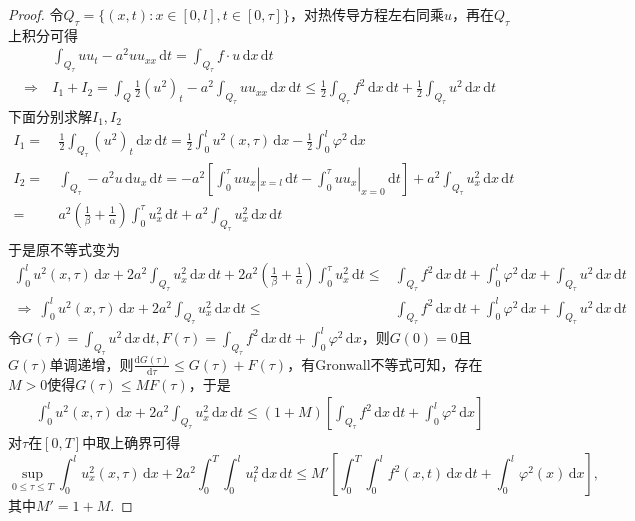 \documentclass[12pt, a4paper, oneside]{ctexart}
\let\leq=\leqslant %
\def\d{\mathrm{d}}          %
\begin{document}
\begin{proof}
    令$Q_\tau = \{(x,t):x\in[0,l],t\in [0,\tau]\}$，对热传导方程左右同乘$u$，再在$Q_\tau$上积分可得
    \begin{align*}
        &\ \int_{Q_\tau}uu_t-a^2uu_{xx}\,\d t = \int_{Q_\tau}f\cdot u\,\d x\,\d t\\
        \Rightarrow&\ I_1+I_2=\int_Q\frac{1}{2}(u^2)_t - a^2\int_{Q_\tau}uu_{xx}\,\d x\,\d t\leq \frac{1}{2}\int_{Q_\tau}f^2\,\d x\,\d t+\frac{1}{2}\int_{Q_\tau}u^2\,\d x\,\d t
    \end{align*}
    下面分别求解$I_1,I_2$
    \begin{align*}
        I_1=&\ \frac{1}{2}\int_{Q_\tau}(u^2)_t\,\d x\,\d t = \frac{1}{2}\int_0^lu^2(x,\tau)\,\d x-\frac{1}{2}\int_0^l\varphi^2\,\d x\\
        I_2=&\ \int_{Q_\tau}-a^2u\,\d u_x\,\d t = -a^2\left[\int_0^\tau uu_x|_{x=l}\,\d t - \int_0^\tau uu_x|_{x=0}\,\d t\right]+a^2\int_{Q_\tau}u_x^2\,\d x\,\d t\\
        =&\ a^2\left(\frac{1}{\beta}+\frac{1}{\alpha}\right)\int_0^\tau u_x^2\,\d t + a^2\int_{Q_\tau}u_x^2\,\d x\,\d t\\
    \end{align*}
    于是原不等式变为
    \begin{align*}
        \int_0^lu^2(x,\tau)\,\d x+2a^2\int_{Q_\tau}u_x^2\,\d x\,\d t+2a^2\left(\frac{1}{\beta}+\frac{1}{\alpha}\right)\int_0^\tau u_x^2\,\d t\leq& \int_{Q_\tau}f^2\,\d x\,\d t + \int_0^l\varphi^2\,\d x + \int_{Q_\tau}u^2\,\d x\,\d t\\
        \Rightarrow\ \int_0^lu^2(x,\tau)\,\d x+2a^2\int_{Q_\tau}u_x^2\,\d x\,\d t\leq& \int_{Q_\tau}f^2\,\d x\,\d t + \int_0^l\varphi^2\,\d x + \int_{Q_\tau}u^2\,\d x\,\d t
    \end{align*}
    令$G(\tau) = \int_{Q_\tau}u^2\,\d x\,\d t, F(\tau) = \int_{Q_\tau}f^2\,\d x\,\d t + \int_0^l\varphi^2\,\d x$，则$G(0) = 0$且$G(\tau)$单调递增，则$\frac{\d G(\tau)}{\d \tau}\leq G(\tau)+F(\tau)$，有Gronwall不等式可知，存在$M>0$使得$G(\tau)\leq MF(\tau)$，于是
    \begin{align*}
        \int_0^lu^2(x,\tau)\,\d x+2a^2\int_{Q_\tau}u_x^2\,\d x\,\d t\leq (1+M)\left[\int_{Q_\tau}f^2\,\d x\,\d t + \int_0^l\varphi^2\,\d x\right]
    \end{align*}
    对$\tau$在$[0,T]$中取上确界可得
    \begin{equation*}
        \sup_{0\leq \tau\leq T}\int_0^lu_x^2(x,\tau)\,\d x+2a^2\int_0^T\int_0^lu_t^2\,\d x\,\d t\leq M'\left[\int_0^T\int_0^lf^2(x,t)\,\d x\,\d t + \int_0^l\varphi^2(x)\,\d x\right],
    \end{equation*}
    其中$M' = 1+M$.
\end{proof}
\end{document}
